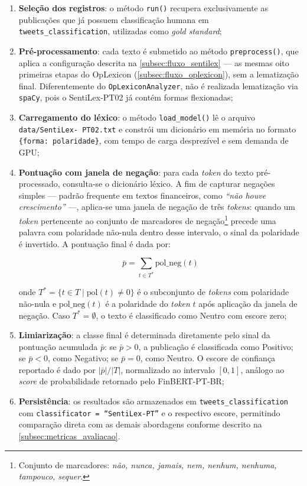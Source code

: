\begin{enumerate}
	\item \textbf{Seleção dos registros}: o método \texttt{run()} recupera exclusivamente as publicações que já possuem classificação humana em \texttt{tweets\_classification}, utilizadas como \textit{gold standard};
	
	\item \textbf{Pré-processamento}: cada texto é submetido ao método \texttt{preprocess()}, que aplica a configuração descrita na \autoref{subsec:fluxo_sentilex} --- as mesmas oito primeiras etapas do OpLexicon (\autoref{subsec:fluxo_oplexicon}), sem a lematização final. Diferentemente do \texttt{OpLexiconAnalyzer}, não é realizada lematização via \texttt{spaCy}, pois o SentiLex-PT02 já contém formas flexionadas;

	\item \textbf{Carregamento do léxico}: o método \texttt{load\_model()} lê o arquivo \texttt{data/SentiLex- PT02.txt} e constrói um dicionário em memória no formato \texttt{\{forma: polaridade\}}, com tempo de carga desprezível e sem demanda de GPU;

	\item \textbf{Pontuação com janela de negação}: para cada \textit{token} do texto pré-processado, consulta-se o dicionário léxico. A fim de capturar negações simples --- padrão frequente em textos financeiros, como \textit{``não houve crescimento''} ---, aplica-se uma janela de negação de três \textit{tokens}: quando um \textit{token} pertencente ao conjunto de marcadores de negação\footnote{Conjunto de marcadores: \textit{não, nunca, jamais, nem, nenhum, nenhuma, tampouco, sequer}.} precede uma palavra com polaridade não-nula dentro desse intervalo, o sinal da polaridade é invertido. A pontuação final é dada por:

	\begin{equation}
		\label{eq:sentilex_score}
		\bar{p} = \sum_{t \in T^{*}} \mathrm{pol\_neg}(t)
	\end{equation}

	\noindent onde $T^{*} = \{t \in T \mid \mathrm{pol}(t) \neq 0\}$ é o subconjunto de \textit{tokens} com polaridade não-nula e $\mathrm{pol\_neg}(t)$ é a polaridade do \textit{token} $t$ após aplicação da janela de negação. Caso $T^{*} = \emptyset$, o texto é classificado como Neutro com escore zero;

	\item \textbf{Limiarização}: a classe final é determinada diretamente pelo sinal da pontuação acumulada $\bar{p}$: se $\bar{p} > 0$, a publicação é classificada como Positivo; se $\bar{p} < 0$, como Negativo; se $\bar{p} = 0$, como Neutro. O escore de confiança reportado é dado por $|\bar{p}| / |T|$, normalizado ao intervalo $[0, 1]$, análogo ao \textit{score} de probabilidade retornado pelo FinBERT-PT-BR;

	\item \textbf{Persistência}: os resultados são armazenados em \texttt{tweets\_classification} com \texttt{classificator = ``SentiLex-PT''} e o respectivo escore, permitindo comparação direta com as demais abordagens conforme descrito na \autoref{subsec:metricas_avaliacao}.
\end{enumerate}


